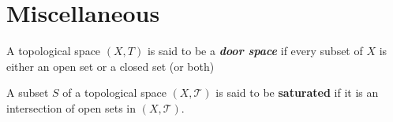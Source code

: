 \documentclass[10pt,a4paper]{report}
\newcommand{\TT}{\mathcal{T}}
\begin{document}
\section{Miscellaneous}

\begin{definition} A topological space $(X,T)$ is said to be a \textbf{\textit{door space}} if every subset of $X$ is either an open set or a closed set (or both)
\end{definition}

\begin{definition}A subset $S$ of a topological space $(X,\TT)$ is said to be \textbf{saturated} if it is an intersection of open sets in $(X, \TT)$.
\end{definition}
\end{document}
